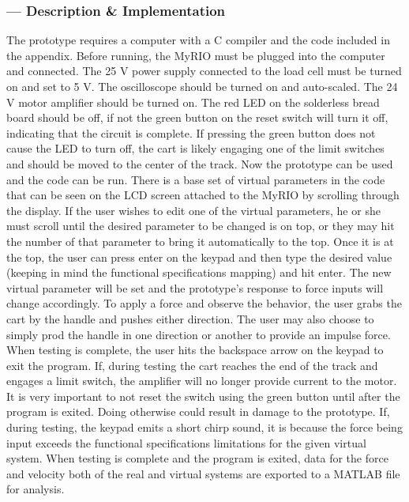 \subsubsection*{ --- Description \& Implementation}
The prototype requires a computer with a C compiler and the code included in the appendix. Before running, the MyRIO must be plugged into the computer and connected. The 25 V power supply connected to the load cell must be turned on and set to 5 V. The oscilloscope should be turned on and auto-scaled. The 24 V motor amplifier should be turned on. The red LED on the solderless bread board should be off, if not the green button on the reset switch will turn it off, indicating that the circuit is complete. If pressing the green button does not cause the LED to turn off, the cart is likely engaging one of the limit switches and should be moved to the center of the track. 
\newline \indent Now the prototype can be used and the code can be run. There is a base set of virtual parameters in the code that can be seen on the LCD screen attached to the MyRIO by scrolling through the display. If the user wishes to edit one of the virtual parameters, he or she must scroll until the desired parameter to be changed is on top, or they may hit the number of that parameter to bring it automatically to the top. Once it is at the top, the user can press enter on the keypad and then type the desired value (keeping in mind the functional specifications mapping) and hit enter. The new virtual parameter will be set and the prototype's response to force inputs will change accordingly. 
\newline \indent To apply a force and observe the behavior, the user grabs the cart by the handle and pushes either direction. The user may also choose to simply prod the handle in one direction or another to provide an impulse force. 
\newline \indent When testing is complete, the user hits the backspace arrow on the keypad to exit the program. If, during testing the cart reaches the end of the track and engages a limit switch, the amplifier will no longer provide current to the motor. It is very important to not reset the switch using the green button until after the program is exited. Doing otherwise could result in damage to the prototype. If, during testing, the keypad emits a short chirp sound, it is because the force being input exceeds the functional specifications limitations for the given virtual system. When testing is complete and the program is exited, data for the force and velocity both of the real and virtual systems are exported to a MATLAB file for analysis.